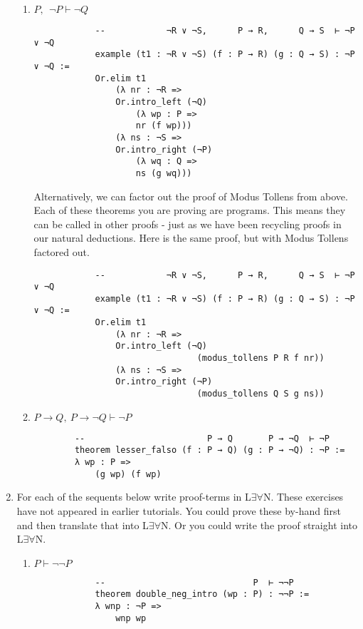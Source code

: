\documentclass[11pt]{report}
\begin{document}
\begin{enumerate}
\begin{enumerate}
		\item $ P,\ \ \neg  P\vdash  \neg  Q$
		
			\begin{lstlisting}
			--            ¬R ∨ ¬S,      P → R,      Q → S  ⊢ ¬P ∨ ¬Q
			example (t1 : ¬R ∨ ¬S) (f : P → R) (g : Q → S) : ¬P ∨ ¬Q :=
			Or.elim t1
				(λ nr : ¬R =>
				Or.intro_left (¬Q)
					(λ wp : P =>
					nr (f wp)))
				(λ ns : ¬S =>
				Or.intro_right (¬P)
					(λ wq : Q =>
					ns (g wq)))
			\end{lstlisting}

		Alternatively, we can factor out the proof of Modus Tollens from above. Each of these theorems you are proving are programs. This means they can be called in other proofs - just as we have been recycling proofs in our natural deductions. Here is the same proof, but with Modus Tollens factored out. 

			\begin{lstlisting}			
			--            ¬R ∨ ¬S,      P → R,      Q → S  ⊢ ¬P ∨ ¬Q
			example (t1 : ¬R ∨ ¬S) (f : P → R) (g : Q → S) : ¬P ∨ ¬Q :=
			Or.elim t1
				(λ nr : ¬R =>
				Or.intro_left (¬Q)
								(modus_tollens P R f nr))
				(λ ns : ¬S =>
				Or.intro_right (¬P)
								(modus_tollens Q S g ns))
			\end{lstlisting}

	   \item $ P\rightarrow Q, \  P\rightarrow \lnot Q \vdash \lnot  P$
	   
		\begin{lstlisting}
		--                        P → Q       P → ¬Q  ⊢ ¬P
		theorem lesser_falso (f : P → Q) (g : P → ¬Q) : ¬P :=
		λ wp : P =>
			(g wp) (f wp)
		\end{lstlisting}

	\end{enumerate}

	\item For each of the sequents below write proof-terms in L$\exists\forall$N. These exercises have not appeared in earlier tutorials. You could prove these by-hand first and then translate that into L$\exists\forall$N. Or you could write the proof straight into L$\exists\forall$N.
	
		\begin{enumerate}
			\item $P \vdash \lnot\lnot P$
			
			\begin{lstlisting}
			--                             P  ⊢ ¬¬P
			theorem double_neg_intro (wp : P) : ¬¬P :=
			λ wnp : ¬P =>
				wnp wp
			\end{lstlisting}


\end{enumerate}
\end{enumerate}
\end{document}
